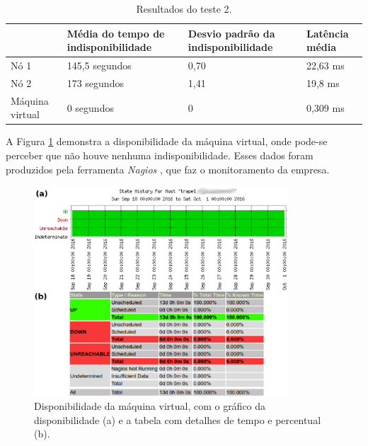 \begin{table}[h!]
\caption{Resultados do teste 2.}
\label{tab:teste2resultados}
\begin{center}
\begin{tabular}{|l|p{4cm}|p{4cm}|l|}\hline
 & \textbf{Média do tempo de indisponibilidade} & \textbf{Desvio padrão da indisponibilidade} & \textbf{Latência média} \\\hline
Nó 1 & 145,5 segundos & 0,70 & 22,63 ms \\\hline
Nó 2 & 173 segundos & 1,41 & 19,8 ms \\\hline
Máquina virtual & 0 segundos & 0 & 0,309 ms \\\hline
\end{tabular}
\end{center}
\end{table}

A Figura \ref{fig:teste2_trapel1} demonstra a disponibilidade da máquina virtual, onde pode-se perceber que não houve nenhuma indisponibilidade. 
Esses dados foram produzidos pela ferramenta \textit{Nagios} \cite{nagios}, que faz o monitoramento da empresa. 
\begin{figure}[h!]
 \centering
 \includegraphics[width=360px]{img/teste2_trapel1.eps}
 \caption{Disponibilidade da máquina virtual, com o gráfico da disponibilidade (a) e a tabela com detalhes de tempo e percentual (b).}
 \label{fig:teste2_trapel1}
\end{figure}

